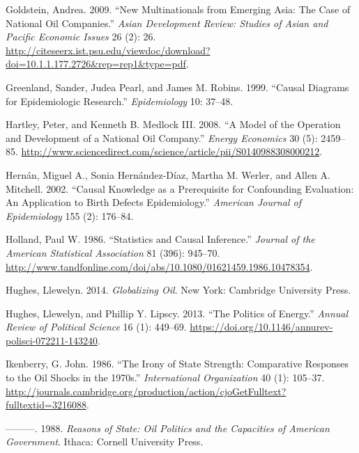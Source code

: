 \documentclass[11pt,]{book}
\begin{document}
\leavevmode\hypertarget{ref-goldstein_new_2009}{}%
Goldstein, Andrea. 2009. ``New Multinationals from Emerging Asia: The Case of National Oil Companies.'' \emph{Asian Development Review: Studies of Asian and Pacific Economic Issues} 26 (2): 26. \url{http://citeseerx.ist.psu.edu/viewdoc/download?doi=10.1.1.177.2726\&rep=rep1\&type=pdf}.

\leavevmode\hypertarget{ref-greenland_causal_1999}{}%
Greenland, Sander, Judea Pearl, and James M. Robins. 1999. ``Causal Diagrams for Epidemiologic Research.'' \emph{Epidemiology} 10: 37--48.

\leavevmode\hypertarget{ref-hartley_model_2008}{}%
Hartley, Peter, and Kenneth B. Medlock III. 2008. ``A Model of the Operation and Development of a National Oil Company.'' \emph{Energy Economics} 30 (5): 2459--85. \url{http://www.sciencedirect.com/science/article/pii/S0140988308000212}.

\leavevmode\hypertarget{ref-hernan_causal_2002}{}%
Hernán, Miguel A., Sonia Hernández-Díaz, Martha M. Werler, and Allen A. Mitchell. 2002. ``Causal Knowledge as a Prerequisite for Confounding Evaluation: An Application to Birth Defects Epidemiology.'' \emph{American Journal of Epidemiology} 155 (2): 176--84.

\leavevmode\hypertarget{ref-holland_statistics_1986}{}%
Holland, Paul W. 1986. ``Statistics and Causal Inference.'' \emph{Journal of the American Statistical Association} 81 (396): 945--70. \url{http://www.tandfonline.com/doi/abs/10.1080/01621459.1986.10478354}.

\leavevmode\hypertarget{ref-hughes_globalizing_2014}{}%
Hughes, Llewelyn. 2014. \emph{Globalizing Oil}. New York: Cambridge University Press.

\leavevmode\hypertarget{ref-hughes_politics_2013}{}%
Hughes, Llewelyn, and Phillip Y. Lipscy. 2013. ``The Politics of Energy.'' \emph{Annual Review of Political Science} 16 (1): 449--69. \url{https://doi.org/10.1146/annurev-polisci-072211-143240}.

\leavevmode\hypertarget{ref-ikenberry_irony_1986}{}%
Ikenberry, G. John. 1986. ``The Irony of State Strength: Comparative Responses to the Oil Shocks in the 1970s.'' \emph{International Organization} 40 (1): 105--37. \url{http://journals.cambridge.org/production/action/cjoGetFulltext?fulltextid=3216088}.

\leavevmode\hypertarget{ref-ikenberry_reasons_1988}{}%
---------. 1988. \emph{Reasons of State: Oil Politics and the Capacities of American Government}. Ithaca: Cornell University Press.
\end{document}
